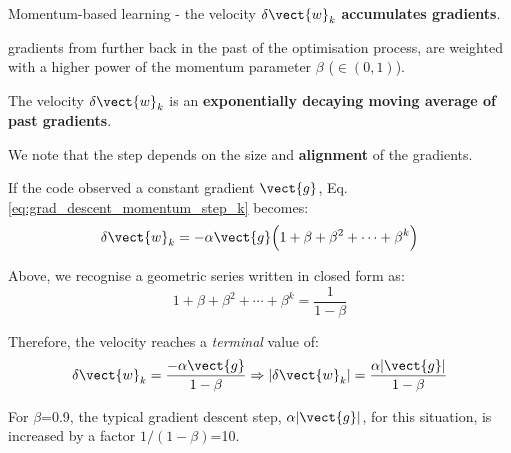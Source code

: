 \begin{frame}[t,allowframebreaks]{
    Momentum-based learning -}
    the \gls{velocity} 
    $\delta \vect{w}_{k}$ {\bf accumulates \glspl{gradient}}.

    \vspace{0.2cm}

    \Glspl{gradient} from further back in the past of the 
    \gls{optimisation} process, 
    are weighted with a higher power of 
    the \gls{momentum parameter} $\beta$ ($\in (0,1)$).

    \vspace{0.2cm}

    The \gls{velocity} $\delta \vect{w}_{k}$ is an 
    {\bf exponentially decaying moving average of past gradients}.

    \framebreak


    We note that the step depends on the size 
    and {\bf alignment} of the gradients.\\
    \vspace{0.2cm}

    If the code observed a constant gradient $\vect{g}$, 
    Eq. \ref{eq:grad_descent_momentum_step_k} becomes:\\
    \begin{equation}
        \delta \vect{w}_{k} = 
            -\alpha \vect{g} \Big(
               1 + \beta + \beta^2 + \cdots + \beta^k
            \Big)
    \end{equation}

    Above, we recognise a geometric series 
    written in closed form as:\\
    \begin{equation}
        1 + \beta + \beta^2 + \cdots + \beta^k = \frac{1}{1-\beta}
    \end{equation}

    Therefore, the velocity reaches a {\em terminal} value of:\\
    \begin{equation}
        \delta \vect{w}_{k} = 
            \frac{-\alpha \vect{g}}{1-\beta} \Rightarrow
        |\delta \vect{w}_{k}| = 
            \frac{\alpha |\vect{g}|}{1-\beta} 
    \end{equation}

    \vspace{0.1cm}

    For $\beta$=0.9, 
    the typical gradient descent step, $\alpha |\vect{g}|$,
    for this situation,
    is increased by a factor $1/(1-\beta)$=10.\\

\end{frame}

